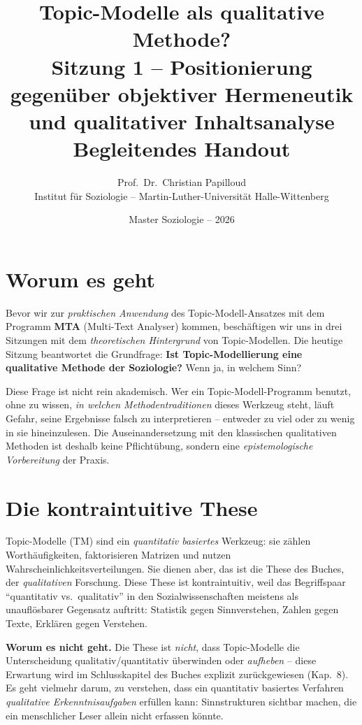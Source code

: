 \documentclass[a4paper,11pt]{article}
\title{\textbf{Topic-Modelle als qualitative Methode?}\\[4pt]
\large Sitzung 1 -- Positionierung gegenüber objektiver Hermeneutik
und qualitativer Inhaltsanalyse\\[8pt]
\normalsize Begleitendes Handout}
\author{Prof.\ Dr.\ Christian Papilloud\\
\small Institut für Soziologie -- Martin-Luther-Universität Halle-Wittenberg}
\date{Master Soziologie -- 2026}
\begin{document}
\maketitle
\thispagestyle{fancy}

\vspace{-1em}

\section{Worum es geht}

Bevor wir zur \emph{praktischen Anwendung} des Topic-Modell-Ansatzes
mit dem Programm \textbf{MTA} (Multi-Text Analyser) kommen,
beschäftigen wir uns in drei Sitzungen mit dem \emph{theoretischen
Hintergrund} von Topic-Modellen. Die heutige Sitzung beantwortet die
Grundfrage: \textbf{Ist Topic-Modellierung eine qualitative Methode
der Soziologie?} Wenn ja, in welchem Sinn?

Diese Frage ist nicht rein akademisch. Wer ein Topic-Modell-Programm
benutzt, ohne zu wissen, \emph{in welchen Methodentraditionen} dieses
Werkzeug steht, läuft Gefahr, seine Ergebnisse falsch zu
interpretieren -- entweder zu viel oder zu wenig in sie hineinzulesen.
Die Auseinandersetzung mit den klassischen qualitativen Methoden ist
deshalb keine Pflichtübung, sondern eine \emph{epistemologische
Vorbereitung} der Praxis.

\section{Die kontraintuitive These}

Topic-Modelle (TM) sind ein \emph{quantitativ basiertes} Werkzeug:
sie zählen Worthäufigkeiten, faktorisieren Matrizen und nutzen
Wahrscheinlichkeitsverteilungen. Sie dienen aber, das ist die These
des Buches, der \emph{qualitativen} Forschung. Diese These ist
kontraintuitiv, weil das Begriffspaar \enquote{quantitativ vs.\
qualitativ} in den Sozialwissenschaften meistens als unauflösbarer
Gegensatz auftritt: Statistik gegen Sinnverstehen, Zahlen gegen Texte,
Erklären gegen Verstehen.

\begin{merkbox}
\textbf{Worum es nicht geht.} Die These ist \emph{nicht}, dass
Topic-Modelle die Unterscheidung qualitativ/quantitativ überwinden
oder \emph{aufheben} -- diese Erwartung wird im Schlusskapitel des
Buches explizit zurückgewiesen (Kap.~8). Es geht vielmehr darum, zu
verstehen, dass ein quantitativ basiertes Verfahren \emph{qualitative
Erkenntnisaufgaben} erfüllen kann: Sinnstrukturen sichtbar machen,
die ein menschlicher Leser allein nicht erfassen könnte.
\end{merkbox}
\end{document}
